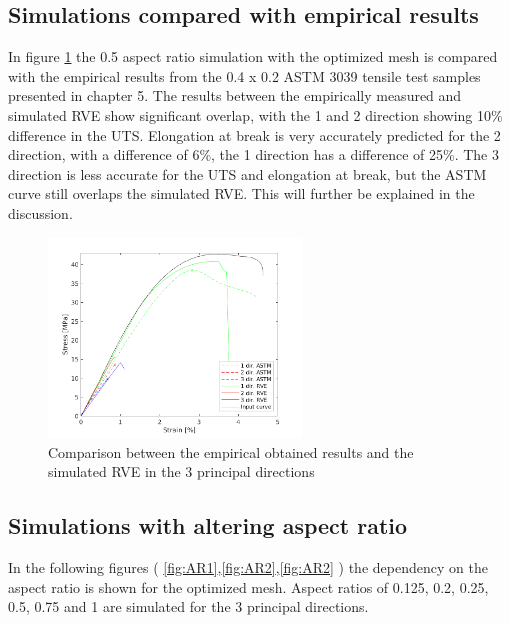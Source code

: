 \subsection{Simulations compared with empirical results }
In figure \ref{fig:ComparisonSS} the 0.5 aspect ratio simulation with the optimized mesh is compared with the empirical results from the 0.4 x 0.2 ASTM 3039 tensile test samples presented in chapter 5. The results between the empirically measured and simulated RVE show significant overlap, with the 1 and 2 direction showing 10\% difference in the UTS. Elongation at break is very accurately predicted for the 2 direction, with a difference of 6\%, the 1 direction has a difference of 25\%. The 3 direction is less accurate for the UTS and elongation at break, but the ASTM curve still overlaps the simulated RVE. This will further be explained in the discussion.

\begin{figure}[H]
    \centering
    \includegraphics[width=0.60\textwidth]{chapter_7_non-elasticmodelling/figures/ComparisonSS.png}
    \caption{Comparison between the empirical obtained results and the simulated RVE in the 3 principal directions}
    \label{fig:ComparisonSS}
\end{figure}

\subsection{Simulations with altering aspect ratio}
In the following figures ( \ref{fig:AR1},\ref{fig:AR2},\ref{fig:AR2} ) the dependency on the aspect ratio is shown for the optimized mesh. Aspect ratios of 0.125, 0.2, 0.25, 0.5, 0.75 and 1 are simulated for the 3 principal directions. 

